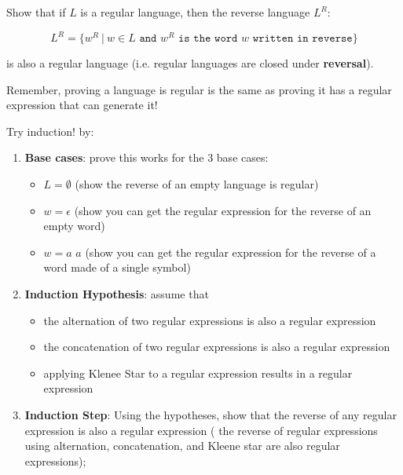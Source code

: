 \documentclass[12pt]{article}
\newenvironment{exercise}[2][Exercise]{\begin{trivlist}
\item[\hskip \labelsep {\bfseries #1}\hskip \labelsep {\bfseries #2.}]}{\end{trivlist}}
\begin{document}
\begin{exercise}{4}

Show that if $L$ is a regular language, then the reverse language $L^R$:

$$L^R = \{w^R \ | \ w\in L \texttt{ and } w^R \texttt{ is the word } w \texttt{ written in reverse}\}$$

is also a regular language (i.e. regular languages are closed under \textbf{reversal}).

Remember, proving a language is regular is the same as proving it has a regular expression that can generate it!

\begin{tip}
Try induction! by:
\begin{enumerate}
    \item \textbf{Base cases}: prove this works for the 3 base cases:
    \begin{itemize}
        \item $L =\emptyset$ (show the reverse of an empty language is regular)
        \item $w=\epsilon$ (show you can get the regular expression for the reverse of an empty word)
        \item $w=a$  $a$ (show you can get the regular expression for the reverse of a word made of a single symbol)
    \end{itemize}
    \item\textbf{ Induction Hypothesis}: assume that  
    \begin{itemize}
        \item the alternation of two regular expressions is also a regular expression
        \item the concatenation of two regular expressions is also a regular expression
        \item applying Klenee Star to a regular expression results in a regular expression
    \end{itemize}

    \item \textbf{Induction Step}: Using the hypotheses, show that the reverse of any regular expression is also a regular expression (
    the reverse of regular expressions using alternation, concatenation, and Kleene star are also regular expressions); 
\end{enumerate}
\end{tip}

\end{exercise}
\end{document}
